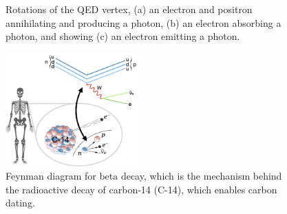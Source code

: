 \begin{figure}[htb]
    \centering
    \quad
    \quad
    \caption[Different versions of the QED vertex]{
        Rotations of the QED vertex, (a) an electron and positron annihilating and producing a photon, (b) an electron absorbing a photon, and showing (c) an electron emitting a photon.
    }
    \label{fig:qed_rotations}
\end{figure}

\begin{figure}[htb]
    \centering
    \includegraphics[width=0.45\textwidth]{fig/feynman/beta_decay.png}
    \caption{
        Feynman diagram for beta decay, which is the mechanism behind the radioactive decay of carbon-14 (C-14), which enables carbon dating. 
    }
    \label{fig:beta_decay}
\end{figure}

